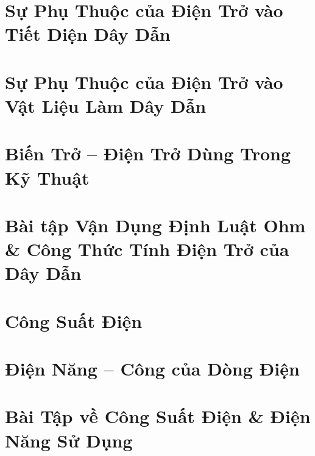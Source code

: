 \documentclass{article}
\begin{document}

\section{Sự Phụ Thuộc của Điện Trở vào Tiết Diện Dây Dẫn}


\section{Sự Phụ Thuộc của Điện Trở vào Vật Liệu Làm Dây Dẫn}


\section{Biến Trở -- Điện Trở Dùng Trong Kỹ Thuật}


\section{Bài tập Vận Dụng Định Luật Ohm \& Công Thức Tính Điện Trở của Dây Dẫn}


\section{Công Suất Điện}


\section{Điện Năng -- Công của Dòng Điện}


\section{Bài Tập về Công Suất Điện \& Điện Năng Sử Dụng}
\end{document}

